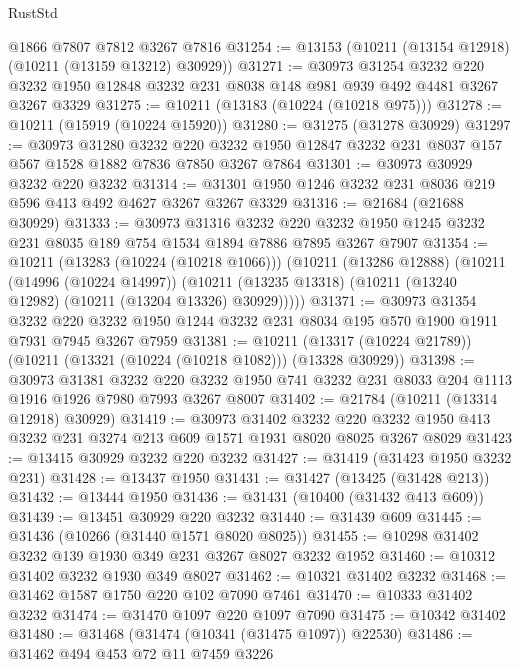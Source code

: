 \begin{lexlean}{RustStd}
\begin{coremodule}
    @1866
    @7807
    @7812
    @3267
    @7816
@31254 := @13153 (@10211 (@13154 @12918) (@10211 (@13159 @13212) @30929))
@31271 := @30973
    @31254
    @3232
    @220
    @3232
    @1950
    @12848
    @3232
    @231
    @8038
    @148
    @981
    @939
    @492
    @4481
    @3267
    @3267
    @3329
@31275 := @10211 (@13183 (@10224 (@10218 @975)))
@31278 := @10211 (@15919 (@10224 @15920))
@31280 := @31275 (@31278 @30929)
@31297 := @30973
    @31280
    @3232
    @220
    @3232
    @1950
    @12847
    @3232
    @231
    @8037
    @157
    @567
    @1528
    @1882
    @7836
    @7850
    @3267
    @7864
@31301 := @30973 @30929 @3232 @220 @3232
@31314 := @31301 @1950 @1246 @3232 @231 @8036 @219 @596 @413 @492 @4627 @3267 @3267 @3329
@31316 := @21684 (@21688 @30929)
@31333 := @30973
    @31316
    @3232
    @220
    @3232
    @1950
    @1245
    @3232
    @231
    @8035
    @189
    @754
    @1534
    @1894
    @7886
    @7895
    @3267
    @7907
@31354 := @10211
    (@13283 (@10224 (@10218 @1066)))
    (@10211
      (@13286 @12888)
      (@10211
        (@14996 (@10224 @14997))
        (@10211 (@13235 @13318) (@10211 (@13240 @12982) (@10211 (@13204 @13326) @30929)))))
@31371 := @30973
    @31354
    @3232
    @220
    @3232
    @1950
    @1244
    @3232
    @231
    @8034
    @195
    @570
    @1900
    @1911
    @7931
    @7945
    @3267
    @7959
@31381 := @10211 (@13317 (@10224 @21789)) (@10211 (@13321 (@10224 (@10218 @1082))) (@13328 @30929))
@31398 := @30973
    @31381
    @3232
    @220
    @3232
    @1950
    @741
    @3232
    @231
    @8033
    @204
    @1113
    @1916
    @1926
    @7980
    @7993
    @3267
    @8007
@31402 := @21784 (@10211 (@13314 @12918) @30929)
@31419 := @30973
    @31402
    @3232
    @220
    @3232
    @1950
    @413
    @3232
    @231
    @3274
    @213
    @609
    @1571
    @1931
    @8020
    @8025
    @3267
    @8029
@31423 := @13415 @30929 @3232 @220 @3232
@31427 := @31419 (@31423 @1950 @3232 @231)
@31428 := @13437 @1950
@31431 := @31427 (@13425 (@31428 @213))
@31432 := @13444 @1950
@31436 := @31431 (@10400 (@31432 @413 @609))
@31439 := @13451 @30929 @220 @3232
@31440 := @31439 @609
@31445 := @31436 (@10266 (@31440 @1571 @8020 @8025))
@31455 := @10298 @31402 @3232 @139 @1930 @349 @231 @3267 @8027 @3232 @1952
@31460 := @10312 @31402 @3232 @1930 @349 @8027
@31462 := @10321 @31402 @3232
@31468 := @31462 @1587 @1750 @220 @102 @7090 @7461
@31470 := @10333 @31402 @3232
@31474 := @31470 @1097 @220 @1097 @7090
@31475 := @10342 @31402
@31480 := @31468 (@31474 (@10341 (@31475 @1097)) @22530)
@31486 := @31462 @494 @453 @72 @11 @7459 @3226

\end{coremodule}
\end{lexlean}
